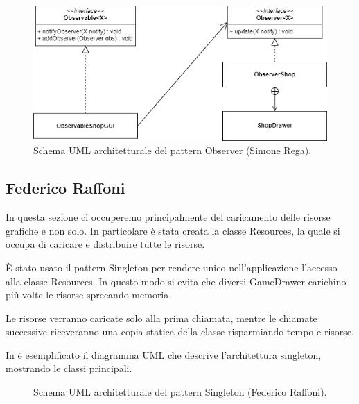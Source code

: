 \documentclass[a4paper,12pt]{report}
\begin{document}
\begin{figure}[!htb]
	\centerline{\includegraphics[scale=0.8]{img/UML_ObserverSimo.png}}
	
	\caption{Schema UML architetturale del pattern Observer (Simone Rega).}
	\label{img:SimoneRega_Observer}
\end{figure}

\subsection{Federico Raffoni}
In questa sezione ci occuperemo principalmente del caricamento delle risorse grafiche e non solo. In particolare è stata creata la classe Resources, la quale si occupa di caricare e distribuire tutte le risorse. 

È stato usato il pattern Singleton per rendere unico nell’applicazione l’accesso alla classe Resources. In questo modo si evita che diversi GameDrawer carichino più volte le risorse sprecando memoria.

 Le risorse verranno caricate solo alla prima chiamata, mentre le chiamate successive riceveranno una copia statica della classe risparmiando tempo e risorse.
 
 In  è esemplificato il diagramma UML che descrive l'architettura singleton, mostrando le classi principali.
\hfill\break

\begin{figure}[!htb]
	\caption{Schema UML architetturale del pattern Singleton (Federico Raffoni).}
	\label{img:FedericoRaffoni_Singleton}
\end{figure}
\end{document}

